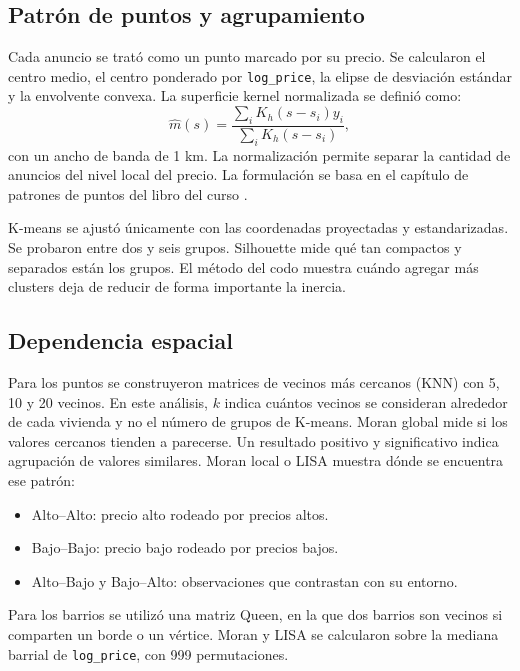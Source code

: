 \documentclass[conference]{IEEEtran}
\begin{document}
\subsection{Patrón de puntos y agrupamiento}

Cada anuncio se trató como un punto marcado por su precio. Se calcularon el centro medio, el centro ponderado por \texttt{log\_price}, la elipse de desviación estándar y la envolvente convexa. La superficie kernel normalizada se definió como:
\begin{equation*}
    \widehat{m}(s)=
    \frac{\sum_i K_h(s-s_i)y_i}
         {\sum_i K_h(s-s_i)},
\end{equation*}
con un ancho de banda de 1 km. La normalización permite separar la cantidad de anuncios del nivel local del precio. La formulación se basa en el capítulo de patrones de puntos del libro del curso \cite{librocurso}.

K-means se ajustó únicamente con las coordenadas proyectadas y estandarizadas. Se probaron entre dos y seis grupos. Silhouette mide qué tan compactos y separados están los grupos. El método del codo muestra cuándo agregar más clusters deja de reducir de forma importante la inercia.

\subsection{Dependencia espacial}

Para los puntos se construyeron matrices de vecinos más cercanos (KNN) con 5, 10 y 20 vecinos. En este análisis, $k$ indica cuántos vecinos se consideran alrededor de cada vivienda y no el número de grupos de K-means. Moran global mide si los valores cercanos tienden a parecerse. Un resultado positivo y significativo indica agrupación de valores similares. Moran local o LISA muestra dónde se encuentra ese patrón:
\begin{itemize}
    \item Alto--Alto: precio alto rodeado por precios altos.
    \item Bajo--Bajo: precio bajo rodeado por precios bajos.
    \item Alto--Bajo y Bajo--Alto: observaciones que contrastan con su entorno.
\end{itemize}

Para los barrios se utilizó una matriz Queen, en la que dos barrios son vecinos si comparten un borde o un vértice. Moran y LISA se calcularon sobre la mediana barrial de \texttt{log\_price}, con 999 permutaciones.
\end{document}

